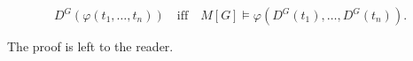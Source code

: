 $$D^G(\varphi(t_1, \ldots, t_n)) \quad \text{iff} \quad M[G] \models \varphi(D^G(t_1), \ldots, D^G(t_n)).$$

The proof is left to the reader.
